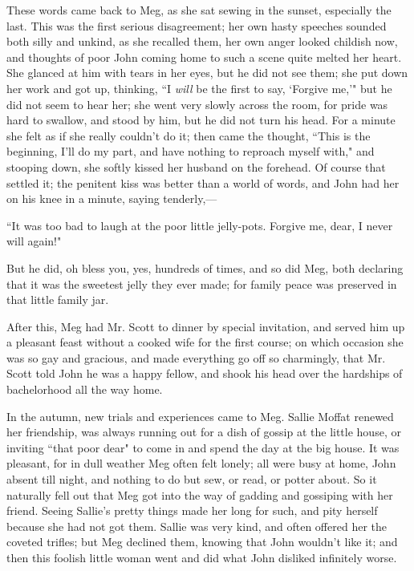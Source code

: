 These words came back to Meg, as she sat sewing in the sunset,
especially the last. This was the first serious disagreement; her own
hasty speeches sounded both silly and unkind, as she recalled them, her
own anger looked childish now, and thoughts of poor John coming home to
such a scene quite melted her heart. She glanced at him with tears in
her eyes, but he did not see them; she put down her work and got up,
thinking, ``I \emph{will} be the first to say, `Forgive
me,'" but he did not seem to hear her; she went very
slowly across the room, for pride was hard to swallow, and stood by him,
but he did not turn his head. For a minute she felt as if she really
couldn't do it; then came the thought, ``This is the
beginning, I'll do my part, and have nothing to reproach
myself with," and stooping down, she softly kissed her husband on the
forehead. Of course that settled it; the penitent kiss was better than a
world of words, and John had her on his knee in a minute, saying
tenderly,---

``It was too bad to laugh at the poor little jelly-pots. Forgive me,
dear, I never will again!"

But he did, oh bless you, yes, hundreds of times, and so did Meg, both
declaring that it was the sweetest jelly they ever made; for family
peace was preserved in that little family jar.

After this, Meg had Mr. Scott to dinner by special invitation, and
served him up a pleasant feast without a cooked wife for the first
course; on which occasion she was so gay and gracious, and made
everything go off so charmingly, that Mr. Scott told John he was a happy
fellow, and shook his head over the hardships of bachelorhood all the
way home.

In the autumn, new trials and experiences came to Meg. Sallie Moffat
renewed her friendship, was always running out for a dish of gossip at
the little house, or inviting ``that poor dear" to come in and spend the
day at the big house. It was pleasant, for in dull weather Meg often
felt lonely; all were busy at home, John absent till night, and nothing
to do but sew, or read, or potter about. So it naturally fell out that
Meg got into the way of gadding and gossiping with her friend. Seeing
Sallie's pretty things made her long for such, and pity
herself because she had not got them. Sallie was very kind, and often
offered her the coveted trifles; but Meg declined them, knowing that
John wouldn't like it; and then this foolish little
woman went and did what John disliked infinitely worse.

